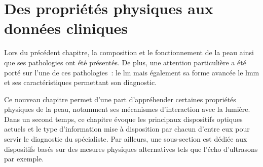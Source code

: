 \chapter{Des propriétés physiques aux données cliniques}
\label{chap:chapter_2}
\chapterintro
Lors du précédent chapitre, la composition et le fonctionnement de la peau ainsi que ses pathologies ont été présentés. De plus, une attention particulière a été porté sur l'une de ces pathologies~: le \acrlong{lm} mais également sa forme avancée le \acrlong{lmm} et ses caractéristiques permettant son diagnostic.\par

Ce nouveau chapitre permet d'une part d'appréhender certaines propriétés physiques de la peau, notamment ses mécanismes d'interaction avec la lumière. Dans un second temps, ce chapitre évoque les principaux dispositifs optiques actuels et le type d'information mise à disposition par chacun d'entre eux pour servir le diagnostic du spécialiste. Par ailleurs, une sous-section est dédiée aux dispositifs basés sur des mesures physiques alternatives tels que l'écho d'ultrasons par exemple.\par

\newpage

